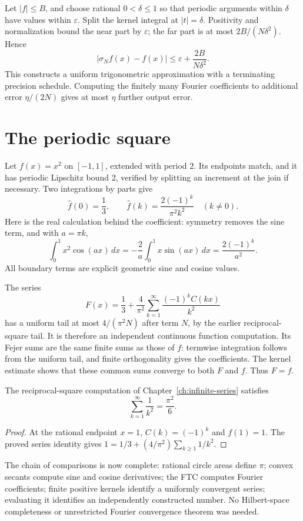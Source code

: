Let $|f|\le B$, and choose rational $0<\delta\le1$ so that periodic
arguments within $\delta$ have values within $\varepsilon$.  Split the
kernel integral at $|t|=\delta$.  Positivity and normalization bound the
near part by $\varepsilon$; the far part is at most
$2B/(N\delta^2)$.  Hence
\[
 \boxed{|\sigma_N f(x)-f(x)|\le\varepsilon+\frac{2B}{N\delta^2}.}
\]
This constructs a uniform trigonometric approximation with a terminating
precision schedule.  Computing the finitely many Fourier coefficients to
additional error $\eta/(2N)$ gives at most $\eta$ further output error.

\section{The periodic square}
Let $f(x)=x^2$ on $[-1,1]$, extended with period $2$.  Its endpoints match,
and it has periodic Lipschitz bound $2$, verified by splitting an increment
at the join if necessary.  Two integrations by parts give
\[
 \widehat f(0)=\frac13,\qquad
 \widehat f(k)=\frac{2(-1)^k}{\pi^2k^2}\quad(k\ne0).
\]
Here is the real calculation behind the coefficient: symmetry removes the
sine term, and with $a=\pi k$,
\[
 \int_0^1x^2\cos(ax)\,dx
 =-\frac2a\int_0^1x\sin(ax)\,dx
 =\frac{2(-1)^k}{a^2}.
\]
All boundary terms are explicit geometric sine and cosine values.

The series
\[
 F(x)=\frac13+\frac4{\pi^2}
          \sum_{k=1}^{\infty}\frac{(-1)^kC(kx)}{k^2}
\]
has a uniform tail at most $4/(\pi^2N)$ after term $N$, by the earlier
reciprocal-square tail.  It is therefore an independent continuous function
computation.  Its Fejer sums are the same finite sums as those of $f$:
termwise integration follows from the uniform tail, and finite
orthogonality gives the coefficients.  The kernel estimate shows that
these common sums converge to both $F$ and $f$.  Thus $F=f$.

\begin{theorem}\label{thm:basel-geometric-overlap}
The reciprocal-square computation of Chapter~\ref{ch:infinite-series}
satisfies
\[
 \boxed{\sum_{k=1}^{\infty}\frac1{k^2}=\frac{\pi^2}{6}.}
\]
\end{theorem}
\begin{proof}
At the rational endpoint $x=1$, $C(k)=(-1)^k$ and $f(1)=1$.  The proved
series identity gives $1=1/3+(4/\pi^2)\sum_{k\ge1}1/k^2$.
\end{proof}

The chain of comparisons is now complete: rational circle areas define
$\pi$; convex secants compute sine and cosine derivatives; the FTC computes
Fourier coefficients; finite positive kernels identify a uniformly
convergent series; evaluating it identifies an independently constructed
number.  No Hilbert-space completeness or unrestricted Fourier convergence
theorem was needed.
